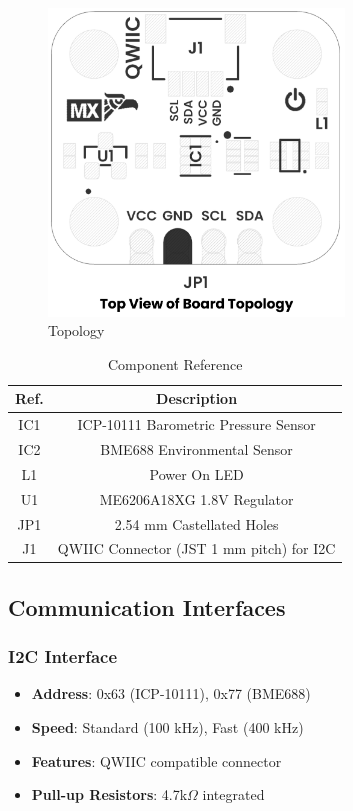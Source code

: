 \documentclass[11pt,a4paper]{article}
\begin{document}
\begin{figure}[H]
\centering
\includegraphics[width=0.7\textwidth]{en_unit_topology_v_1_0_0_icp10111_barometric_pressure_sensor.png}
\caption{Topology}
\label{fig:en-unit-topology-v-1-0-0-icp10111-barometric-pressure-sensor-png}
\end{figure}




\begin{table}[H]
\centering
\small
\begin{tabular}{|c|c|}
\hline
Ref. & Description \\
\hline
IC1 & ICP-10111 Barometric Pressure Sensor \\
IC2 & BME688 Environmental Sensor \\
L1 & Power On LED \\
U1 & ME6206A18XG 1.8V Regulator \\
JP1 & 2.54 mm Castellated Holes \\
J1 & QWIIC Connector (JST 1 mm pitch) for I2C \\
\hline
\end{tabular}
\caption{Component Reference}
\end{table}


\subsection{Communication Interfaces}

\subsubsection{I2C Interface}
\begin{itemize}
\item \textbf{Address}: 0x63 (ICP-10111), 0x77 (BME688)
\item \textbf{Speed}: Standard (100 kHz), Fast (400 kHz)
\item \textbf{Features}: QWIIC compatible connector
\item \textbf{Pull-up Resistors}: 4.7k$\Omega$ integrated
\end{itemize}
\end{document}
